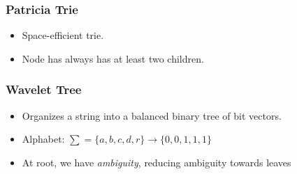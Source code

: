 \documentclass{beamer}
\begin{document}
\begin{frame}
\frametitle{Patricia Trie}
\begin{itemize}
  \item Space-efficient trie.
  \item Node has always has at least two children.
\end{itemize}
\begin{figure}
\end{figure}
\end{frame}


\begin{frame}
\frametitle{Wavelet Tree}
\begin{itemize}
  \item Organizes a string into a balanced binary tree of bit vectors.
  \item Alphabet: $\sum = \{a,b,c,d,r\} \rightarrow \{0, 0, 1, 1, 1\}$
  \item At root, we have \emph{ambiguity}, reducing ambiguity towards leaves
\end{itemize}
\begin{figure}
\end{figure}
\end{frame}
\end{document}

